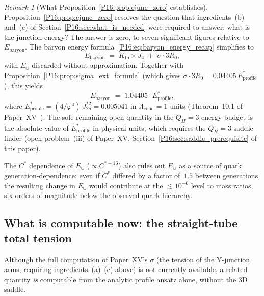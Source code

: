 \documentclass[11pt,a4paper]{article}
\theoremstyle{definition}\newtheorem{definition}[theorem]{Definition}
\theoremstyle{remark}
\newtheorem{remark}[theorem]{Remark}
\theoremstyle{definition}\newtheorem{construction}[theorem]{Construction}
\newcommand{\vp}{\varphi}
\newcommand{\Lcond}{\Lambda_{\mathrm{cond}}}
\newcommand{\Kfb}{K_{\mathrm{fb}}}
\newcommand{\QH}{Q_H}
\begin{document}
\begin{remark}[What Proposition~\ref{P16:prop:ejunc_zero} establishes]
\label{P16:rem:ejunc_consequence}
Proposition~\ref{P16:prop:ejunc_zero} resolves the question that
ingredients~(b) and~(c) of Section~\ref{P16:sec:what_is_needed} were
required to answer: what is the junction energy?  The answer is zero,
to seven significant figures relative to $E_{\mathrm{baryon}}$.
The baryon energy formula~\eqref{P16:eq:baryon_energy_recap} simplifies to
\begin{equation}
  E_{\mathrm{baryon}} \;=\; \Kfb\times J_4 \;+\; \sigma\cdot 3R_0,
  \label{P16:eq:baryon_simplified}
\end{equation}
with $E_\cup$ discarded without approximation.  Together with
Proposition~\ref{P16:prop:sigma_ext_formula} (which gives $\sigma\cdot3R_0
= 0.04405\,E_{\mathrm{profile}}^*$), this yields
\begin{equation}
  \boxed{E_{\mathrm{baryon}} \;=\; 1.04405\cdot E_{\mathrm{profile}}^*,}
  \label{P16:eq:baryon_final}
\end{equation}
where $E_{\mathrm{profile}}^*=(4/\vp^4)\,J_{2a}^{*2}=0.005041$ in
$\Lcond=1$ units (Theorem~10.1 of Paper~XV~\cite{Paper15}).
The sole remaining open quantity in the $\QH=3$ energy budget is the
absolute value of $E_{\mathrm{profile}}^*$ in physical units, which
requires the $\QH=3$ saddle finder (open problem~(iii) of Paper~XV,
Section~\ref{P16:sec:saddle_prerequisite} of this paper).

The $C^*$ dependence of $E_\cup$ ($\propto C^{*-16}$) also rules out
$E_\cup$ as a source of quark generation-dependence: even if $C^*$
differed by a factor of~$1.5$ between generations, the resulting change
in $E_\cup$ would contribute at the $\lesssim10^{-6}$ level to mass
ratios, six orders of magnitude below the observed quark hierarchy.
\end{remark}

\subsection{What is computable now: the straight-tube total tension}
\label{P16:sec:sigma_computable}

Although the full computation of Paper~XV's $\sigma$ (the tension of
the Y-junction arms, requiring ingredients~(a)--(c) above) is not
currently available, a related quantity \emph{is} computable from
the analytic profile ansatz alone, without the 3D saddle.
\end{document}
